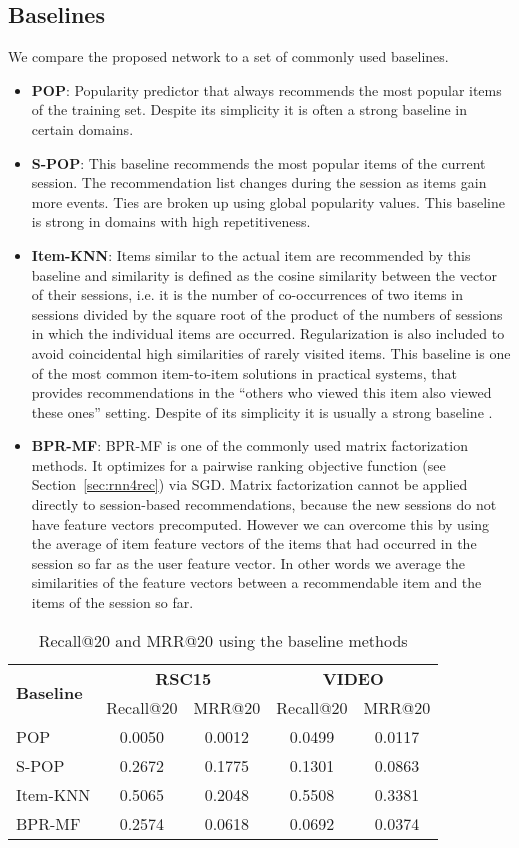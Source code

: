 \subsection{Baselines}
We compare the proposed network to a set of commonly used baselines.
\begin{itemize}[noitemsep,nolistsep]
\item \textbf{POP}: Popularity predictor that always recommends the most popular items of the training set. Despite its simplicity it is often a strong baseline in certain domains.
\item \textbf{S-POP}: This baseline recommends the most popular items of the current session. The recommendation list changes during the session as items gain more events. Ties are broken up using global popularity values. This baseline is strong in domains with high repetitiveness.
\item \textbf{Item-KNN}: Items similar to the actual item are recommended by this baseline and similarity is defined as the cosine similarity between the vector of their sessions, i.e. it is the number of co-occurrences of two items in sessions divided by the square root of the product of the numbers of sessions in which the individual items are occurred. Regularization is also included to avoid coincidental high similarities of rarely visited items. This baseline is one of the most common item-to-item solutions in practical systems, that provides recommendations in the ``others who viewed this item also viewed these ones'' setting. Despite of its simplicity it is usually a strong baseline \citep{linden2003amazon,JamesRecsys10}.
\item \textbf{BPR-MF}: BPR-MF \citep{bpr} is one of the commonly used matrix factorization methods. It optimizes for a pairwise ranking objective function (see Section~\ref{sec:rnn4rec}) via SGD. Matrix factorization cannot be applied directly to session-based recommendations, because the new sessions do not have feature vectors precomputed. However we can overcome this by using the average of item feature vectors of the items that had occurred in the session so far as the user feature vector. In other words we average the similarities of the feature vectors between a recommendable item and the items of the session so far.
\end{itemize}

\begin{table}
\centering
\caption{Recall@20 and MRR@20 using the baseline methods}\label{tab:baselines}
\medskip
{\small
\begin{tabular}{lcccc}
\toprule
\multirow{2}{*}{\textbf{Baseline}} & \multicolumn{2}{c}{\textbf{RSC15}} & \multicolumn{2}{c}{\textbf{VIDEO}} \\
& Recall@20 & MRR@20 & Recall@20 & MRR@20 \\
\midrule
POP & 0.0050 & 0.0012 & 0.0499 & 0.0117 \\
S-POP & 0.2672 & 0.1775 & 0.1301 & 0.0863 \\
Item-KNN & 0.5065 & 0.2048 & 0.5508 & 0.3381 \\
BPR-MF & 0.2574 & 0.0618 & 0.0692 & 0.0374 \\
\bottomrule
\end{tabular}}
\end{table}

